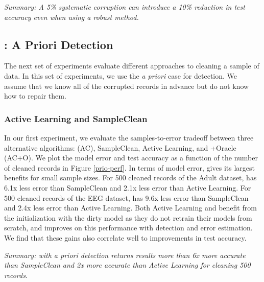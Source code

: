 \vspace{0.25em}

\noindent \emph{Summary: A 5\% systematic corruption can introduce a 10\% reduction in test accuracy even when using a robust method.}

\subsection{\sys: A Priori Detection}
The next set of experiments evaluate different approaches to cleaning a sample of data.
In this set of experiments, we use the \emph{a priori} case for detection.
We assume that we know all of the corrupted records in advance but do not know how to repair them. 

\subsubsection{Active Learning and SampleClean}
In our first experiment, we evaluate the samples-to-error tradeoff between three alternative algorithms: \sys (AC), SampleClean, Active Learning, and \sys+Oracle (AC+O).
We plot the model error and test accuracy as a function of the number of cleaned records in Figure \ref{prio-perf}.
In terms of model error, \sys gives its largest benefits for small sample sizes.
For 500 cleaned records of the Adult dataset, \sys has 6.1x less error than SampleClean and 2.1x less error than Active Learning.
For 500 cleaned records of the EEG dataset, \sys has 9.6x less error than SampleClean and 2.4x less error than Active Learning.
Both Active Learning and \sys benefit from the initialization with the dirty model as they do not retrain their models from scratch, and \sys improves on this performance with detection and error estimation.
We find that these gains also correlate well to improvements in test accuracy.

\vspace{0.25em}

\noindent \emph{Summary: \sys with a priori detection returns results more than 6x more accurate than SampleClean and 2x more accurate than Active Learning for cleaning 500 records.}

